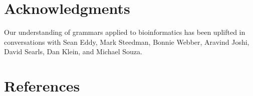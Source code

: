 \documentclass[10pt]{article}
\begin{document}
\newpage
\section{Acknowledgments}

Our understanding of grammars applied to bioinformatics has been uplifted in conversations with
Sean Eddy, Mark Steedman, Bonnie Webber, Aravind Joshi, David Searls, Dan Klein, and Michael Souza.

\section{References}


\end{document}
